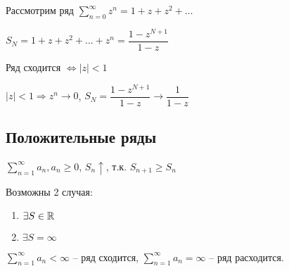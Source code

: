 \begin{example}
\begin{enumerate}
\begin{tikzpicture}[x=0.75pt,y=0.75pt,yscale=-1,xscale=1]
    
    \end{tikzpicture}
    
    Рассмотрим ряд $\sum_{n = 0}^{\infty} z^n = 1 + z + z ^ 2 + \dots$
    

    $S_N = 1 + z + z^2 + \dots + z^n = \dfrac{1 - z^{N + 1}}{1 - z}$

    Ряд сходится $\Leftrightarrow |z| < 1$
    
    $|z| < 1 \Rightarrow z^n \rightarrow 0$, $S_N = \dfrac{1 - z^{N + 1}}{1 - z} \to \dfrac{1}{1 - z}$ 
\end{enumerate}
\end{example}
\subsection{Положительные ряды}
$\sum_{n = 1}^{\infty} a_n, a_n \geq 0$, 
$S_n \uparrow$, т.к. $S_{n + 1} \geq S_{n}$

Возможны 2 случая:
\begin{enumerate}
    \item $\exists S \in \RR$
    \item $\exists S = \infty$
\end{enumerate}
\begin{designation}
    $\sum_{n = 1}^{\infty} a_n < \infty$ -- ряд сходится,
    $\sum_{n = 1}^{\infty} a_n = \infty$ -- ряд расходится.
\end{designation}
